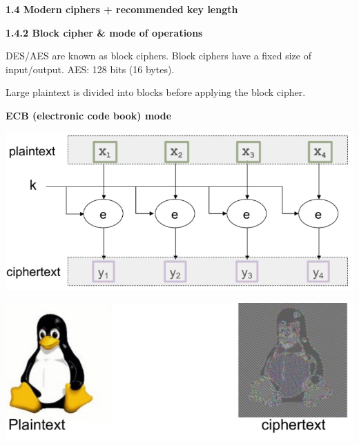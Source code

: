 \documentclass[landscape,a4paper]{extarticle}
\newenvironment{Figure}
  {\par\noindent\minipage{\linewidth}}
  {\endminipage\par\medskip}
\begin{document}
\begin{multicols*}{5}
    \textbf{1.4 Modern ciphers + recommended key length}

    \textbf{1.4.2 Block cipher \& mode of operations}

    DES/AES are known as block ciphers. Block ciphers have a fixed size of input/output.
    AES: 128 bits (16 bytes). 

    Large plaintext is divided into blocks before applying the block cipher.

    \textbf{ECB (electronic code book) mode}
    \begin{Figure}
        \centering
        \includegraphics[width=\linewidth]{ecb_encryption.png}        
    \end{Figure}
    \begin{Figure}
        \centering
        \includegraphics[width=\linewidth]{ecb_penguin.png}        
    \end{Figure}


\end{multicols*}
\end{document}

